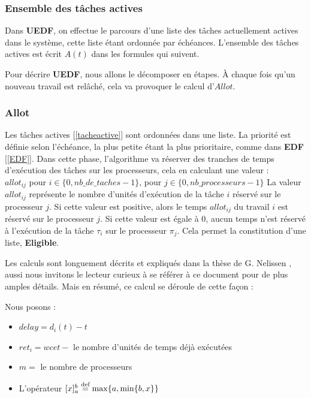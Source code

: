 	
	\subsubsection{Ensemble des tâches actives}\label{ensembledestachesactives}
	Dans \textbf{UEDF}, on effectue le parcours d'une liste des tâches actuellement actives dans le système, 
	cette liste étant ordonnée par échéances. 
	 L'ensemble des tâches actives est écrit $A(t)$ dans les formules qui suivent.\newline
	
	Pour décrire \textbf{UEDF}, nous allons le décomposer en étapes.
	À chaque fois qu'un nouveau travail est relâché, cela va provoquer le calcul d'$Allot$.
	\subsubsection{Allot}
	Les tâches actives [\ref*{tacheactive}] sont ordonnées dans une liste. La priorité est définie selon l'échéance, 
	la plus petite étant la plus prioritaire, comme dans \textbf{EDF} [\ref*{EDF}].
	Dans cette phase, l'algorithme va \og{}réserver\fg{} des tranches de temps d'exécution des tâches sur les 
	processeurs, cela en calculant une valeur : \\
	$allot_{ij}$ pour $i \in \{0, nb\_de\_taches - 1\}$, pour $j \in \{0, nb\_processeurs - 1\}$
	La valeur $allot_{ij}$ représente le nombre d'unités d'exécution de la tâche $i$ réservé sur le processeur $j$.\newline
	Si cette valeur est positive, alors le temps $allot_{ij}$ du travail $i$ est réservé sur le 
	processeur $j$. Si cette valeur est égale à $0$, aucun temps n'est réservé 
	à l'exécution de la tâche $\tau_i$ sur le processeur $\pi_j$. Cela permet la constitution d'une liste, 
	\textbf{Eligible}.\newline


	Les calculs sont longuement décrits et expliqués dans la thèse de G. Nelissen \cite{nelissen_u-edf_2012}, aussi nous invitons 
	le lecteur curieux à se référer à ce document pour de plus amples détails. Mais en résumé, 
	ce calcul se déroule de cette façon :
	
	Nous posons :
	\begin{itemize}
		\setlength\itemsep{0.1em}
		\item $delay = d_i(t) - t$
		\item $ret_i = wcet - $ le nombre d'unités de temps déjà exécutées
		\item $m = $ le nombre de processeurs
		\item L'opérateur $[x]_a^b \stackrel{\text{def}}{=} \max\{a, \min\{b, x \}\}$
	\end{itemize}


